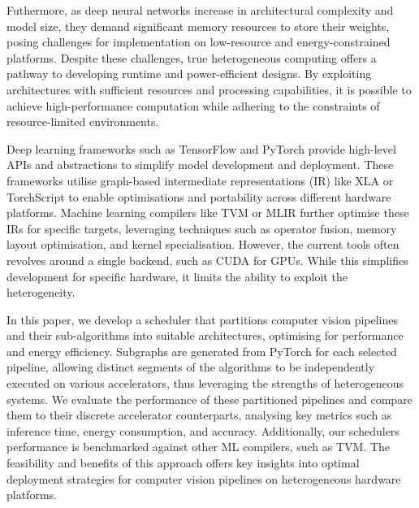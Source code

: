 \documentclass[]{spie}  %
\begin{document}
Futhermore, as deep neural networks increase in architectural complexity and model size, they demand significant memory resources to store their weights, posing challenges for implementation on low-resource and energy-constrained platforms. Despite these challenges, true heterogeneous computing offers a pathway to developing runtime and power-efficient designs. By exploiting architectures with sufficient resources and processing capabilities, it is possible to achieve high-performance computation while adhering to the constraints of resource-limited environments.

Deep learning frameworks such as TensorFlow\cite{tensorflow2015} and PyTorch\cite{Pytorch} provide high-level APIs and abstractions to simplify model development and deployment. These frameworks utilise graph-based intermediate representations (IR) like XLA or TorchScript to enable optimisations and portability across different hardware platforms. Machine learning compilers like TVM\cite{chen2018} or MLIR\cite{mlir} further optimise these IRs for specific targets, leveraging techniques such as operator fusion, memory layout optimisation, and kernel specialisation. However, the current tools often revolves around a single backend, such as CUDA for GPUs. While this simplifies development for specific hardware, it limits the ability to exploit the heterogeneity.


In this paper, we develop a scheduler that partitions computer vision pipelines and their sub-algorithms into suitable architectures, optimising for performance and energy efficiency. Subgraphs are generated from PyTorch for each selected pipeline, allowing distinct segments of the algorithms to be independently executed on various accelerators, thus leveraging the strengths of heterogeneous systems. We evaluate the performance of these partitioned pipelines and compare them to their discrete accelerator counterparts, analysing key metrics such as inference time, energy consumption, and accuracy. Additionally, our schedulers performance is benchmarked against other ML compilers, such as TVM. The feasibility and benefits of this approach offers key insights into optimal deployment strategies for computer vision pipelines on heterogeneous hardware platforms.

\end{document}
